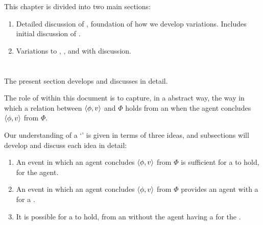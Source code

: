 \begin{note}
  This chapter is divided into two main sections:
  \begin{enumerate}[label=, leftmargin=*]
  \item

    Detailed discussion of , foundation of how we develop variations.
    Includes initial discussion of .
  \item

    Variations to \qWhy{}, \qHow{}, and \issueInclusion{} with discussion.
  \end{enumerate}
\end{note}


\section{}
\label{cha:var:ros}

\begin{note}
  The present section develops and discusses  in detail.

  The role of  within this document is to capture, in a abstract way, the way in which a relation between \(\langle \phi, v \rangle\) and \(\Phi\) holds from an \agpe{} when the agent concludes \(\langle \phi, v \rangle\) from \(\Phi\).
\end{note}

\begin{note}
  Our understanding of a `' is given in terms of three ideas, and subsections will develop and discuss each idea in detail:

  \begin{enumerate}[label=, leftmargin=*]
  \item

    An event in which an agent concludes \(\langle \phi, v \rangle\) from \(\Phi\) is sufficient for a \ros{} to hold, for the agent.
  \item

    An event in which an agent concludes \(\langle \phi, v \rangle\) from \(\Phi\) provides an agent with a  for a \ros{}.
  \item

    It is possible for a \ros{} to hold, from an \agpe{} without the agent having a \wit{} for the \ros{}.
  \end{enumerate}
\end{note}

